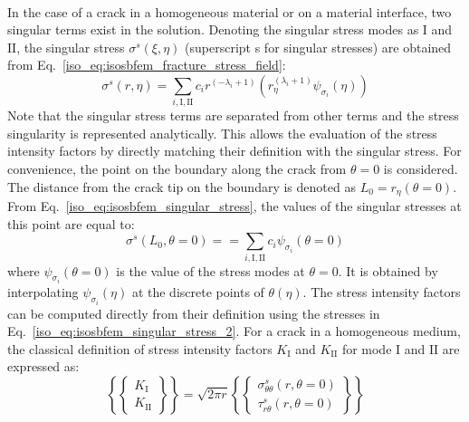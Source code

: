 \paragraph{}
In the case of a crack in a homogeneous material or on a material interface, two singular terms exist in the solution.
Denoting the singular stress modes as $\mathrm{I}$ and $\mathrm{II}$, the singular stress $\sigma^{s}(\xi,\eta)$ (superscript s for singular stresses) are obtained from Eq.~\ref{iso_eq:isosbfem_fracture_stress_field}:
\begin{equation}
    \sigma^s(r,\eta)
    =\sum_{i,\mathrm{I},\mathrm{II}}
    c_i r^{(-\lambda_i + 1)}
    (
        r_\eta^{(\lambda_i+1)}
        \psi_{\sigma_i}(\eta)
    )
\label{iso_eq:isosbfem_singular_stress}
\end{equation}
Note that the singular stress terms are separated from other terms and the stress singularity is represented analytically.
This allows the evaluation of the stress intensity factors by directly matching their definition with the singular stress.
For convenience, the point on the boundary along the crack from $\theta=0$ is considered.
The distance from the crack tip on the boundary is denoted as $L_0 = r_\eta(\theta=0)$.
From Eq.~\ref{iso_eq:isosbfem_singular_stress}, the values of the singular stresses at this point are equal to:
\begin{equation}
    \sigma^s (L_0, \theta = 0) =
    =\sum_{i,\mathrm{I},\mathrm{II}}
    c_i \psi_{\sigma_i}(\theta=0)
    \label{iso_eq:isosbfem_singular_stress_2}
\end{equation}
where $\psi_{\sigma_i}(\theta=0)$ is the value of the stress modes at $\theta=0$.
It is obtained by interpolating $\psi_{\sigma_i}(\eta)$ at the discrete points of $\theta(\eta)$.
The stress intensity factors can be computed directly from their definition using the stresses in Eq.~\ref{iso_eq:isosbfem_singular_stress_2}.
For a crack in a homogeneous medium, the classical definition of stress intensity factors $K_{\mathrm{I}}$ and $K_{\mathrm{II}}$ for mode $\mathrm{I}$ and $\mathrm{II}$ are expressed as:
\begin{equation}
    \left\{
        \begin{Bmatrix}
            K_{\mathrm{I}}\\
            K_{\mathrm{II}}
        \end{Bmatrix}
    \right\}=\sqrt{2\pi r}\left\{
        \begin{Bmatrix}
            \sigma_{\theta\theta}^s(r,\theta=0) \\
            \tau_{r\theta}^s(r,\theta=0)
        \end{Bmatrix}
    \right\}
    \label{iso_eq:isosbfem_crack_homo}
\end{equation}
